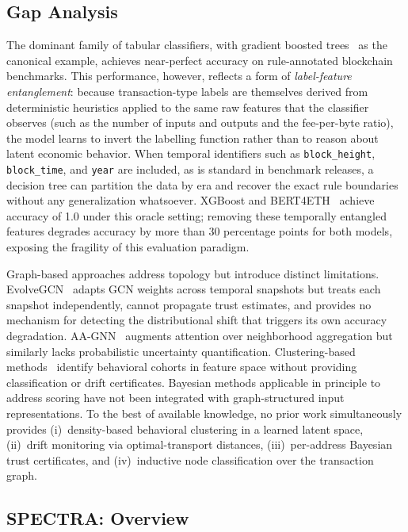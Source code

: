 \documentclass[journal]{IEEEtran}
\begin{document}
\subsection*{Gap Analysis}

The dominant family of tabular classifiers, with gradient boosted
trees~\cite{Chen2016} as the canonical example, achieves near-perfect
accuracy on rule-annotated blockchain benchmarks.
This performance, however, reflects a form of \emph{label-feature
entanglement}: because transaction-type labels are themselves derived from
deterministic heuristics applied to the same raw features that the classifier
observes (such as the number of inputs and outputs and the fee-per-byte ratio),
the model learns to invert the labelling function rather than to reason about
latent economic behavior.
When temporal identifiers such as \texttt{block\_height}, \texttt{block\_time},
and \texttt{year} are included, as is standard in benchmark releases, a
decision tree can partition the data by era and recover the exact rule
boundaries without any generalization whatsoever.
XGBoost and BERT4ETH~\cite{He2023} achieve accuracy of \num{1.0} under
this oracle setting; removing these temporally entangled features degrades
accuracy by more than \num{30} percentage points for both models, exposing the
fragility of this evaluation paradigm.

Graph-based approaches address topology but introduce distinct limitations.
EvolveGCN~\cite{Pareja2020} adapts GCN weights across temporal snapshots
but treats each snapshot independently, cannot propagate trust estimates,
and provides no mechanism for detecting the distributional shift that triggers
its own accuracy degradation.
AA-GNN~\cite{ZhaoW2026} augments attention over neighborhood aggregation but
similarly lacks probabilistic uncertainty quantification.
Clustering-based methods~\cite{McInnes2017} identify behavioral cohorts in
feature space without providing classification or drift certificates.
Bayesian methods applicable in principle to address scoring
\cite{Fan2025} have not been integrated with graph-structured input
representations.
To the best of available knowledge, no prior work simultaneously provides
(i)~density-based behavioral clustering in a learned latent space,
(ii)~drift monitoring via optimal-transport distances,
(iii)~per-address Bayesian trust certificates, and
(iv)~inductive node classification over the transaction graph.

\subsection*{SPECTRA: Overview}
\end{document}

